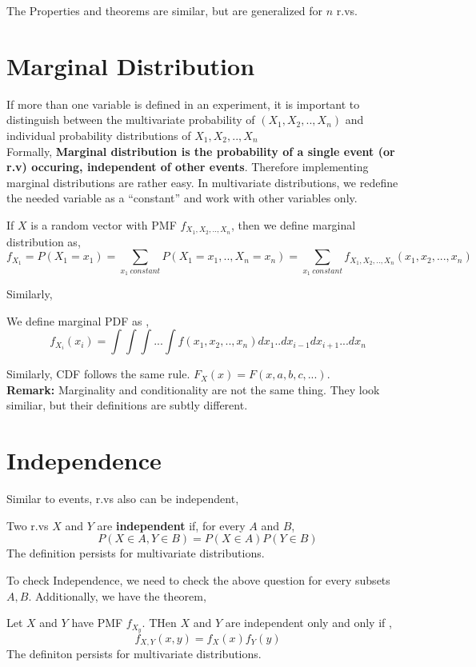 The Properties and theorems are similar, but are generalized for $n$ r.vs.

\section{Marginal Distribution}
If more than one variable is defined in an experiment, it is important to distinguish between the multivariate probability of
$(X_1,X_2,..,X_n)$ and individual probability distributions of $X_1,X_2,..,X_n$\\

Formally, \textbf{Marginal distribution is the probability of a single event (or r.v) occuring, independent of other events}. Therefore
implementing marginal distributions are rather easy. In multivariate distributions, we redefine the needed variable as a ``constant'' and
work with other variables only.
\begin{definition}
    If $X$ is a random vector with PMF $f_{X_1,X_2,..,X_n}$, then we define marginal distribution as,
    \[f_{X_1}= P(X_1 = x_1)= \sum_{x_1 \ constant} P(X_1=x_1,..,X_n=x_n)= \sum_{x_1\ constant} f_{X_1,X_2,..,X_n}(x_1,x_2,...,x_n)\]
\end{definition}
Similarly,
\begin{definition}
    We define marginal PDF as ,
    \[f_{X_i}(x_i) =  \int \int \int ... \int f(x_1,x_2,..,x_n)dx_1..dx_{i-1}dx_{i+1}...dx_n \]
\end{definition}
Similarly, CDF follows the same rule. $F_X(x)= F(x,a,b,c,...)$. \\
\textbf{Remark:} Marginality and conditionality are not the same thing. They look similiar, but their definitions are subtly different.
\par
\section{Independence}
Similar to events, r.vs also can be independent,
\begin{definition}
    Two r.vs $X$ and $Y$ are \textbf{independent} if, for every $A$ and $B$,
    \[P(X \in A, Y \in B)= P(X \in A)P(Y \in B)\]
    The definition persists for multivariate distributions.
\end{definition}
To check Independence, we need to check the above question for every subsets $A,B$. Additionally, we have the theorem,
\begin{theorem}
    Let $X$ and $Y$ have PMF $f_{X_y}$. THen $X$ and $Y$ are independent only and only if ,
    \[f_{X,Y}(x,y)=f_X(x)f_Y(y) \]
    The definiton persists for multivariate distributions.
\end{theorem}

